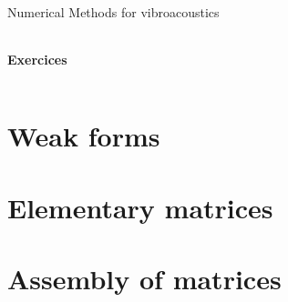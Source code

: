 \documentclass[10pt,a4paper]{report}
\begin{document}
\begin{center}
{\Large Numerical Methods for vibroacoustics }
 \begin{tabularx}{\linewidth}{c}
\hline
\end{tabularx}
\end{center}
\begin{center}
 {\Large \textbf{Exercices}\\}
\end{center}
 \begin{tabularx}{\linewidth}{c}
\hline
\end{tabularx}
\setcounter{chapter}{1}



\section{Weak forms}






\section{Elementary matrices}






\section{Assembly of matrices}


\end{document}
